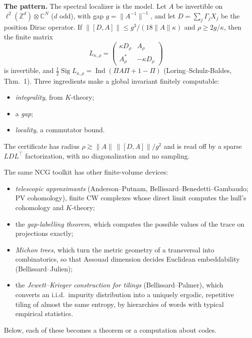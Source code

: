 \documentclass[11pt]{article}
\theoremstyle{definition}
\theoremstyle{remark}
\newcommand{\Z}{\mathbb Z}
\newcommand{\Sig}{\operatorname{Sig}}
\newcommand{\Ind}{\operatorname{Ind}}
\begin{document}
\textbf{The pattern.} The spectral localizer is the model. Let $A$ be invertible on $\ell^2(\Z^d)\otimes\mathbb C^N$ ($d$ odd), with gap $g=\|A^{-1}\|^{-1}$, and let $D=\sum_j\Gamma_jX_j$ be the position Dirac operator. If $\|[D,A]\|\le g^3/(18\|A\|\kappa)$ and $\rho\ge2g/\kappa$, then the finite matrix
\[L_{\kappa,\rho}=\begin{pmatrix}\kappa D_\rho&A_\rho\\A_\rho^*&-\kappa D_\rho\end{pmatrix}\]
is invertible, and $\tfrac12\Sig L_{\kappa,\rho}=\Ind(\Pi A\Pi+1-\Pi)$ (Loring--Schulz-Baldes, Thm.~1). Three ingredients make a global invariant finitely computable:
\begin{itemize}
\item \emph{integrality}, from $K$-theory;
\item a \emph{gap};
\item \emph{locality}, a commutator bound.
\end{itemize}
The certificate has radius $\rho\gtrsim\|A\|\,\|[D,A]\|/g^2$ and is read off by a sparse $LDL^\top$ factorization, with no diagonalization and no sampling.

The same NCG toolkit has other finite-volume devices:
\begin{itemize}
\item \emph{telescopic approximants} (Anderson--Putnam, Bellissard--Benedetti--Gambaudo; PV cohomology), finite CW complexes whose direct limit computes the hull's cohomology and $K$-theory;
\item the \emph{gap-labelling theorem}, which computes the possible values of the trace on projections exactly;
\item \emph{Michon trees}, which turn the metric geometry of a transversal into combinatorics, so that Assouad dimension decides Euclidean embeddability (Bellissard--Julien);
\item the \emph{Jewett--Krieger construction for tilings} (Bellissard--Palmer), which converts an i.i.d.\ impurity distribution into a uniquely ergodic, repetitive tiling of almost the same entropy, by hierarchies of words with typical empirical statistics.
\end{itemize}
Below, each of these becomes a theorem or a computation about codes.
\end{document}
